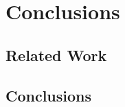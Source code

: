 \chapter{Conclusions}

\section{Related Work}
\label{sec:relatedwork}

\section{Conclusions}
\label{sec:conclusions}

